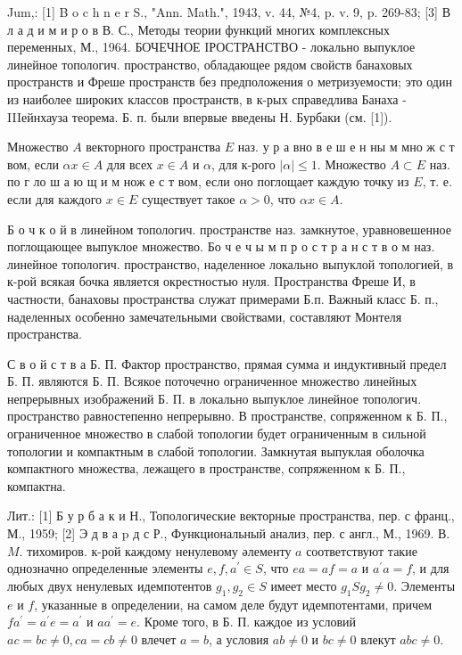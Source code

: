 \documentclass[10pt]{article}
\begin{document}
Jum,: [1] B o c h n e r S., "Ann. Math.", 1943, v. 44, №4, p. v. 9, p. 269-83; [3] В л а д и м и р о в В. С., Методы теории функций многих комплексных переменных, М., 1964. БОЧЕЧНОЕ IРОСТРАНСТВО - локально выпуклое линейное топологич. пространство, обладающее рядом свойств банаховых пространств и Фреше пространств без предположения о метризуемости; это один из наиболее широких классов пространств, в к-рых справедлива Банаха - IIIейнхауза теорема. Б. п. были впервые введены Н. Бурбаки (см. [1]).



Множество $A$ векторного пространства $E$ наз. у р а вно в е ш е н ны м мно ж с т вом, если $\alpha x \in A$ для всех $x \in A$ и $\alpha$, для к-рого $|\alpha| \leqslant 1$. Множество $A \subset E$ наз. по г ло ш а ю щ и м нож е с т вом, если оно поглощает каждую точку из $E$, т. е. если для каждого $x \in E$ существует такое $\alpha>0$, что $\alpha x \in A$.



Б о ч к о й в линейном топологич. пространстве наз. замкнутое, уравновешенное поглощающее выпуклое множество. Бо ч е ч ы м п р о с т р а н с т в о м наз. линейное топологич. пространство, наделенное локально выпуклой топологией, в к-рой всякая бочка является окрестностью нуля. Пространства Фреше И, в частности, банаховы пространства служат примерами Б.п. Важный класс Б. п., наделенных особенно замечательными свойствами, составляют Монтеля пространства.



С в о й с т в а Б. П. Фактор пространство, прямая сумма и индуктивный предел Б. П. являются Б. П. Всякое поточечно ограниченное множество линейных непрерывных изображений Б. П. в локально выпуклое линейное топологич. пространство равностепенно непрерывно. В пространстве, сопряженном к Б. П., ограниченное множество в слабой топологии будет ограниченным в сильной топологии и компактным в слабой топологии. Замкнутая выпуклая оболочка компактного множества, лежащего в пространстве, сопряженном к Б. П., компактна.



Лит.: [1] Б у р б а к и Н., Топологические векторные пространства, пер. с франц., М., 1959; [2] Э д в а p д с Р., Функциональный анализ, пер. с англ., М., 1969. В. $M$. тихомиров. к-рой каждому ненулевому әлементу $a$ соответствуют такие однозначно определенные элементы $e, f, a^{\prime} \in S$, что $e a=a f=a$ и $a^{\prime} a=f$, и для любых двух ненулевых идемпотентов $g_{1}, g_{2} \in S$ имеет место $g_{1} S g_{2} \neq 0$. Элементы $e$ и $f$, указанные в определении, на самом деле будут идемпотентами, причем $f a^{\prime}=a^{\prime} e=a^{\prime}$ и $a a^{\prime}=e$. Кроме того, в Б. П. каждое из условий $a c=b c \neq 0, c a=c b \neq 0$ влечет $a=b$, а условия $a b \neq 0$ и $b c \neq 0$ влекут $a b c \neq 0$.
\end{document}
